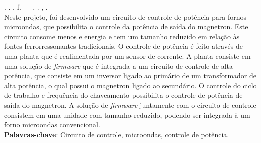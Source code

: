 
\begin{resumo}[RESUMO]
\begin{SingleSpacing}

\imprimirautorcitacao. \imprimirtitulo. \imprimirdata. \pageref {LastPage} f. \imprimirprojeto\ – \imprimirprograma, \imprimirinstituicao. \imprimirlocal, \imprimirdata.\\


Neste projeto, foi desenvolvido um circuito de controle de potência para fornos microondas, que possibilita o controle da potência de saída do magnetron. Este circuito consome menos e energia e tem um tamanho reduzido em relação às fontes ferrorressonantes tradicionais. O controle de potência é feito através de uma planta que é realimentada por um sensor de corrente. A planta consiste em uma solução de \textit{firmware} que é integrada a um circuito de controle de alta potência, que consiste em um inversor ligado ao primário de um transformador de alta potência, o qual possui o magnetron ligado ao secundário. O controle do ciclo de trabalho e frequência do chaveamento possibilita o controle de potência de saída do magnetron. A solução de \textit{firmware} juntamente com o circuito de controle consistem em uma unidade com tamanho reduzido, podendo ser integrada à um forno microondas convencional.\\

\textbf{Palavras-chave}: Circuito de controle, microondas, controle de potência.

\end{SingleSpacing}
\end{resumo}

